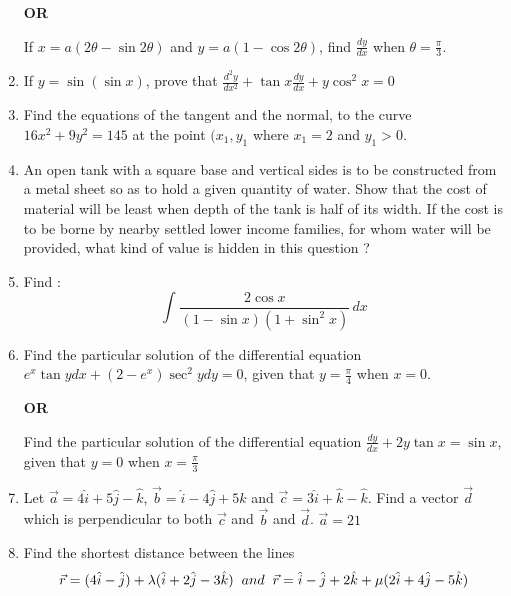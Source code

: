 \documentclass{exam}
\begin{document}
\begin{enumerate}
     \begin{center}
     \textbf{OR}
     \end{center}
     
     If $ x = a(2\theta - \sin 2\theta )$ and 
     $ y = a(1 - \cos 2\theta)$, find $\frac{dy}{dx}$ when $\theta = \frac{\pi}{3}$.
     
     \item If $ y = \sin (\sin x) $,
     prove that 
     $ \frac{d^{2}y}{dx^{2}} + \tan x\frac{dy}{dx} + y\cos^{2} x = 0 $
     
     \item Find the equations of the tangent and the normal, to the curve $ 16x^{2} + 9y^{2} = 145 $ at the point $(x_{1} , y_{1}$ where $x_{1} = 2$ 
     and $y_{1} > 0$.
     
     \item An open tank with a square base and vertical sides is to be constructed from a metal sheet so as to hold a given quantity of water. Show that the cost of material will be least when depth of the tank is half of its width. If the cost is to be borne by nearby settled lower income families, for whom water will be provided, what kind of value is hidden in this question ?
     
     \item Find :
     $$ \int_{}^{} \frac{2\cos x}{(1-\sin x)(1 + \sin^{2} x)} \,dx $$
     
     \item Find the particular solution of the differential equation 
     $e^{x}\tan y dx + (2 - e^{x})\sec^{2} y dy = 0$, given that $y = \frac{\pi}{4}$ when $x=0$. 
     
     \begin{center}
     \textbf{OR}
     \end{center}
     
     Find the particular solution of the differential equation $\frac{dy}{dx} + 2y\tan x = \sin x$, given that $y = 0$ when $x = \frac{\pi}{3}$
     
     \item Let $\vec{a} = 4\hat{i} + 5\hat{j} - \hat{k}$, $\vec{b} = \hat{i} - 4\hat{j} + 5\hat{k}$ and $\vec{c} = 3\hat{i} + \hat{k} - \hat{k}$. Find a vector $\vec{d}$ which is perpendicular to both $\vec{c}$ and $\vec{b}$ and $\vec{d}$. $\vec{a} = 21$
     
     \item Find the shortest distance between the lines 
     $$\vec{r}  = (4\hat{i} - \hat{j}) + \lambda(\hat{i} + 2\hat{j} - 3\hat{k}) \hspace{2mm}and \hspace{2mm}\vec{r} = \hat{i} - \hat{j} + 2\hat{k} + \mu(2\hat{i} + 4\hat{j} - 5\hat{k})$$
     

\end{enumerate}
\end{document}

